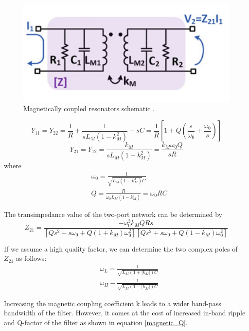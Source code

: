 \begin{figure}[h]
    \centering
    \includegraphics{figures/magnetically-coupled-resonators.PNG}
    \caption{Magnetically coupled
resonators schematic \cite{5G-and-E-band}.}
    \label{fig:magnetically-coupled-resonators}
\end{figure}

\begin{equation}
    Y_{11}=Y_{22}=\frac{1}{R}+\frac{1}{sL_M\left (1-k_M^2\right )}+sC=\frac{1}{R}\left[1+Q\left (\frac{s}{\omega_0}+\frac{\omega_0}{s}\right )\right]
\end{equation}
\begin{equation}
    Y_{21}=Y_{12}=\frac{k_M}{sL_M\left (1-k_M^2\right )}=\frac{k_M\omega_0Q}{sR}
\end{equation}
where
\begin{align}
    &\omega_0=\frac{1}{\sqrt{L_M\left (1-k_M^2\right )}C}\\
    &Q=\frac{R}{\omega_0L_M\left (1-k_M^2\right )}=\omega_0RC \label{magnetic_Q}
\end{align}

The transimpedance value of the two-port network can be determined by
\begin{equation}
    Z_{21}=\frac{-\omega_0^3k_MQRs}{\left [Qs^2+s\omega_0+Q\left (1+k_M\right )\omega_0^2\right ]\left [Qs^2+s\omega_0+Q\left (1-k_M\right )\omega_0^2\right]}
\end{equation}

If we assume a high quality factor, we can determine the two complex poles of $Z_{21}$ as follows:
\begin{align}
    &\omega_L=\frac{1}{\sqrt{L_M\left(1+\left|k_M\right|\right)C}}\\
    &\omega_H-\frac{1}{\sqrt{L_M\left(1-\left|k_M\right|\right)C}}
\end{align}

Increasing the magnetic coupling coefficient k leads to a wider band-pass bandwidth of the filter. However, it comes at the cost of increased in-band ripple and Q-factor of the filter as shown in equation \ref{magnetic_Q}.

